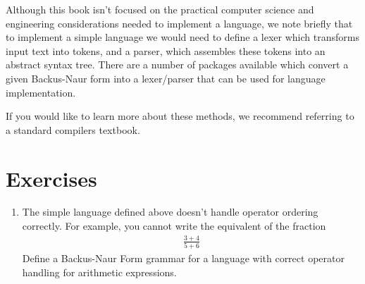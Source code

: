 \documentclass[book.tex]{subfiles}
\begin{document}
Although this book isn't focused on the practical computer science and engineering considerations needed to implement a language, we note briefly that to implement a simple language we would need to define a lexer which transforms input text into tokens, and a parser, which assembles these tokens into an abstract syntax tree. There are a number of packages available which convert a given Backus-Naur form into a lexer/parser that can be used for language implementation.


If you would like to learn more about these methods, we recommend referring to a standard compilers textbook.

\section{Exercises}
\begin{enumerate}
    \item The simple language defined above doesn't handle operator ordering correctly. For example, you cannot write the equivalent of the fraction
    \begin{align}
        \frac{3+4}{5+6}
    \end{align}
    Define a Backus-Naur Form grammar for a language with correct operator handling for arithmetic expressions.
\end{enumerate}
\end{document}

